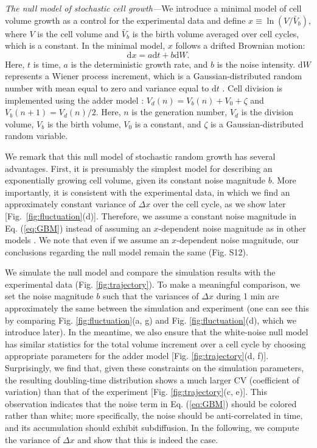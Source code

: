 \documentclass[aps, prl, twocolumn, longbibliography, linenumbers, superscriptaddress]{revtex4-2}
\newcommand{\blue}{\color{blue}}
\begin{document}
{\it The null model of stochastic cell growth---}We introduce a minimal model of cell volume growth as a control for the experimental data and define $x\equiv \ln(V/\bar V_b)$, where $V$ is the cell volume and $\bar V_b$ is the birth volume averaged over cell cycles, which is a constant. In the minimal model, $x$ follows a drifted Brownian motion:
\begin{equation}
	\mathrm{d}x = a \mathrm{d}t + b \mathrm{d}W.
	\label{eq:GBM}
\end{equation}
Here, $t$ is time, $a$ is the deterministic growth rate, and $b$ is the noise intensity. $\mathrm{d}W$ represents a Wiener process increment, which is a Gaussian-distributed random number with mean equal to zero and variance equal to $\mathrm{d}t$ \cite{Gardiner2004handbook}. Cell division is implemented using the adder model \cite{Amir2014cell, Taheri2015cell, Ho2018modeling}: $V_d(n)=V_b(n)+V_0 + \zeta $ and $V_b(n+1)=V_d(n)/2$. Here, $n$ is the generation number, $V_d$ is the division volume, $V_b$ is the birth volume, $V_0$ is a constant, and $\zeta$ is a Gaussian-distributed random variable.

{\blue We remark that this null model of stochastic random growth has several advantages. First, it is presumably the simplest model for describing an exponentially growing cell volume, given its constant noise magnitude $b$. More importantly, it is consistent with the experimental data, in which we find an approximately constant variance of $\Delta x$ over the cell cycle, as we show later [Fig.~\ref{fig:fluctuation}(d)]. Therefore, we assume a constant noise magnitude in Eq. (\ref{eq:GBM}) instead of assuming an $x$-dependent noise magnitude as in other models \cite{Biswas2014scaling}. We note that even if we assume an $x$-dependent noise magnitude, our conclusions regarding the null model remain the same (Fig. S12).}
	
We simulate the null model and compare the simulation results with the experimental data (Fig. \ref{fig:trajectory}). To make a meaningful comparison, we set the noise magnitude $b$ such that the variances of $\Delta x$ during 1 min are approximately the same between the simulation and experiment (one can see this by comparing Fig. \ref{fig:fluctuation}(a, g) and Fig. \ref{fig:fluctuation}(d), which we introduce later). In the meantime, we also ensure that the white-noise null model has similar statistics for the total volume increment over a cell cycle by choosing appropriate parameters for the adder model {\blue [Fig. \ref{fig:trajectory}(d, f)]. Surprisingly, we find that, given these constraints on the simulation parameters, the resulting doubling-time distribution shows a much larger CV (coefficient of variation) than that of the experiment [Fig. \ref{fig:trajectory}(c, e)]. This observation indicates that the noise term in Eq. (\ref{eq:GBM}) should be colored rather than white; more specifically, the noise should be anti-correlated in time, and its accumulation should exhibit subdiffusion. In the following, we compute the variance of $\Delta x$ and show that this is indeed the case.}
\end{document}
